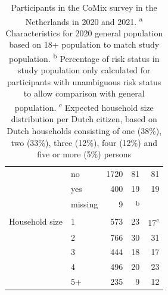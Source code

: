\documentclass[fleqn,10pt]{wlscirep}
\begin{document}
\begin{table}[ht]
\begin{tabular}{llrrr}
   & no & 1720 & 81 & 81 \\ 
   & yes & 400 & 19 & 19 \\ 
   & missing & 9 & \textsuperscript{b} &  \\ 
  \hline
  Household size & 1 & 573 & 23 & 17\textsuperscript{c} \\ 
   & 2 & 766 & 30 & 31 \\ 
   & 3 & 444 & 18 & 17 \\ 
   & 4 & 496 & 20 & 23 \\ 
   & 5+ & 235 & 9 & 12 \\ 
  \hline
  \hline
\end{tabular}
\caption{\label{tab:part}Participants in the CoMix survey in the Netherlands in 2020 and 2021.
 \protect\linebreak \textsuperscript{a} Characteristics for 2020 general population based on 18+ population to match study population.
 \protect\linebreak \textsuperscript{b} Percentage of risk status in study population only calculated for participants with unambiguous risk status to allow comparison with general population.
\protect\linebreak \textsuperscript{c} Expected household size distribution per Dutch citizen, based on Dutch households consisting of one (38\%), two (33\%), three (12\%), four (12\%) and five or more (5\%) persons \cite{Backer_2021}}
\end{table}

\clearpage
\end{document}
